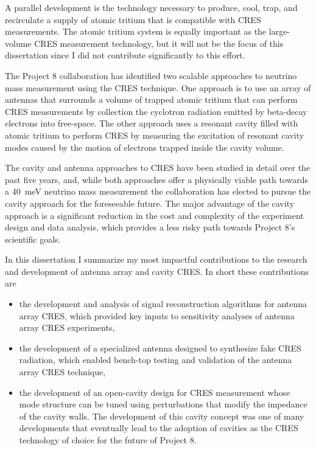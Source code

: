 A parallel development is the technology necessary to produce, cool, trap, and recirculate a supply of atomic tritium that is compatible with CRES measurements. The atomic tritium system is equally important as the large-volume CRES measurement technology, but it will not be the focus of this dissertation since I did not contribute significantly to this effort.

The Project 8 collaboration has identified two scalable approaches to neutrino mass measurement using the CRES technique. One approach is to use an array of antennas that surrounds a volume of trapped atomic tritium that can perform CRES measurements by collection the cyclotron radiation emitted by beta-decay electrons into free-space. The other approach uses a resonant cavity filled with atomic tritium to perform CRES by measuring the excitation of resonant cavity modes caused by the motion of electrons trapped inside the cavity volume. 

The cavity and antenna approaches to CRES have been studied in detail over the past five years, and, while both approaches offer a physically viable path towards a 40~meV neutrino mass measurement the collaboration has elected to pursue the cavity approach for the foreseeable future. The major advantage of the cavity approach is a significant reduction in the cost and complexity of the experiment design and data analysis, which provides a less risky path towards Project 8's scientific goals. 

In this dissertation I summarize my most impactful contributions to the research and development of antenna array and cavity CRES. In short these contributions are
\begin{itemize}
    \item the development and analysis of signal reconstruction algorithms for antenna array CRES, which provided key inputs to sensitivity analyses of antenna array CRES experiments,
    \item the development of a specialized antenna designed to synthesize fake CRES radiation, which enabled bench-top testing and validation of the antenna array CRES technique,
    \item the development of an open-cavity design for CRES measurement whose mode structure can be tuned using perturbations that modify the impedance of the cavity walls. The development of this cavity concept was one of many developments that eventually lead to the adoption of cavities as the CRES technology of choice for the future of Project 8. 
\end{itemize}

